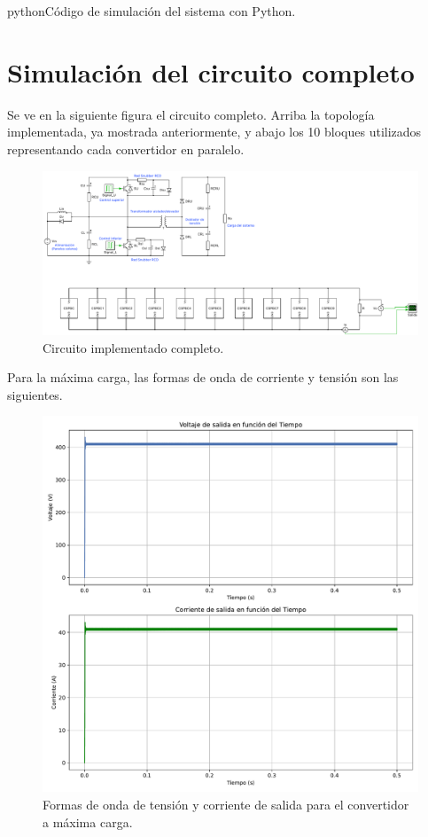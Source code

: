 \begin{appendixd}
\begin{sourcecode}{python}{Código de simulación del sistema con Python.}
	\end{sourcecode}
	
	\section{Simulación del circuito completo}
	
	Se ve en la siguiente figura el circuito completo. Arriba la topología implementada, ya mostrada anteriormente, y abajo los 10 bloques utilizados representando cada convertidor en paralelo.
	
	\begin{figure}
		\centering
		\includegraphics[width=1\linewidth]{img/schematic_com}
		\caption{Circuito implementado completo.}
		\label{fig:schematiccom}
	\end{figure}
	
	Para la máxima carga, las formas de onda de corriente y tensión son las siguientes.
	
	\begin{figure}
		\centering
		\includegraphics[width=1\linewidth]{img/salida_completa}
		\caption{Formas de onda de tensión y corriente de salida para el convertidor a máxima carga.}
		\label{fig:salidacompleta}
	\end{figure}
	

\end{appendixd}
